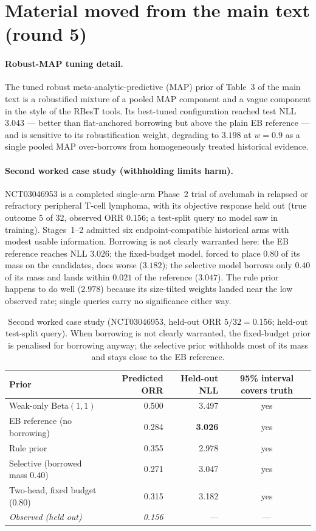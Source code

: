 \documentclass[11pt]{article}
\begin{document}
\section{Material moved from the main text (round 5)}

\paragraph{Robust-MAP tuning detail.} The tuned robust
meta-analytic-predictive (MAP) prior of Table~3 of the main text is a
robustified mixture of a pooled MAP component and a vague component in the
style of the RBesT tools. Its best-tuned configuration reached test NLL
$3.043$ --- better than flat-anchored borrowing but above the plain EB
reference --- and is sensitive to its robustification weight, degrading to
$3.198$ at $w = 0.9$ as a single pooled MAP over-borrows from
homogeneously treated historical evidence.

\paragraph{Second worked case study (withholding limits harm).}
NCT03046953 is a completed single-arm Phase~2 trial of avelumab in
relapsed or refractory peripheral T-cell lymphoma, with its objective
response held out (true outcome $5$ of $32$, observed ORR $0.156$; a
test-split query no model saw in training). Stages~1--2 admitted six
endpoint-compatible historical arms with modest usable information.
Borrowing is not clearly warranted here: the EB reference reaches NLL
$3.026$; the fixed-budget model, forced to place $0.80$ of its mass on
the candidates, does worse ($3.182$); the selective model borrows only
$0.40$ of its mass and lands within $0.021$ of the reference ($3.047$).
The rule prior happens to do well ($2.978$) because its size-tilted
weights landed near the low observed rate; single queries carry no
significance either way.

\begin{table}[htbp]
\centering
\caption{Second worked case study (NCT03046953, held-out ORR
$5/32 = 0.156$; held-out test-split query). When borrowing is not clearly
warranted, the fixed-budget prior is penalised for borrowing anyway; the
selective prior withholds most of its mass and stays close to the EB
reference.}
\begin{tabular}{lrrc}
\toprule
Prior & Predicted ORR & Held-out NLL & 95\% interval covers truth \\
\midrule
Weak-only $\mathrm{Beta}(1,1)$ & 0.500 & 3.497 & yes \\
EB reference (no borrowing) & 0.284 & \textbf{3.026} & yes \\
Rule prior & 0.355 & 2.978 & yes \\
Selective (borrowed mass $0.40$) & 0.271 & 3.047 & yes \\
Two-head, fixed budget ($0.80$) & 0.315 & 3.182 & yes \\
\textit{Observed (held out)} & \textit{0.156} & --- & --- \\
\bottomrule
\end{tabular}
\end{table}
\end{document}
